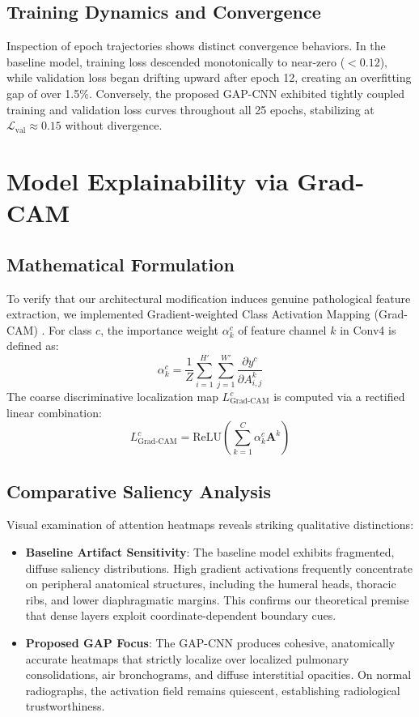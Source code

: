 \documentclass[conference]{IEEEtran}
\begin{document}
\subsection{Training Dynamics and Convergence}
Inspection of epoch trajectories shows distinct convergence behaviors. In the baseline model, training loss descended monotonically to near-zero ($<0.12$), while validation loss began drifting upward after epoch 12, creating an overfitting gap of over 1.5\%. Conversely, the proposed GAP-CNN exhibited tightly coupled training and validation loss curves throughout all 25 epochs, stabilizing at $\mathcal{L}_{\text{val}} \approx 0.15$ without divergence.

\section{Model Explainability via Grad-CAM}
\subsection{Mathematical Formulation}
To verify that our architectural modification induces genuine pathological feature extraction, we implemented Gradient-weighted Class Activation Mapping (Grad-CAM) \cite{b_selvaraju}. For class $c$, the importance weight $\alpha_k^c$ of feature channel $k$ in Conv4 is defined as:
\begin{equation}
\alpha_k^c = \frac{1}{Z} \sum_{i=1}^{H'} \sum_{j=1}^{W'} \frac{\partial y^c}{\partial A_{i, j}^k}
\label{eq_gradcam_weight}
\end{equation}
The coarse discriminative localization map $L_{\text{Grad-CAM}}^c$ is computed via a rectified linear combination:
\begin{equation}
L_{\text{Grad-CAM}}^c = \text{ReLU} \left( \sum_{k=1}^C \alpha_k^c \mathbf{A}^k \right)
\label{eq_gradcam_map}
\end{equation}

\subsection{Comparative Saliency Analysis}
Visual examination of attention heatmaps reveals striking qualitative distinctions:
\begin{itemize}
    \item \textbf{Baseline Artifact Sensitivity}: The baseline model exhibits fragmented, diffuse saliency distributions. High gradient activations frequently concentrate on peripheral anatomical structures, including the humeral heads, thoracic ribs, and lower diaphragmatic margins. This confirms our theoretical premise that dense layers exploit coordinate-dependent boundary cues.
    \item \textbf{Proposed GAP Focus}: The GAP-CNN produces cohesive, anatomically accurate heatmaps that strictly localize over localized pulmonary consolidations, air bronchograms, and diffuse interstitial opacities. On normal radiographs, the activation field remains quiescent, establishing radiological trustworthiness.
\end{itemize}
\end{document}
